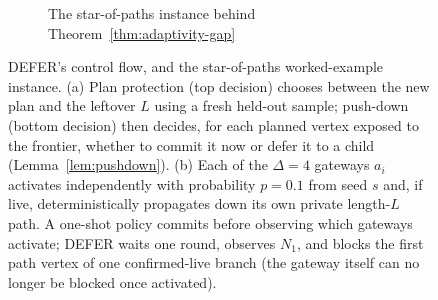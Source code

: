 \documentclass[preprint,11pt]{elsarticle}
\theoremstyle{definition}
\theoremstyle{remark}
\begin{document}
\begin{figure}[h]
\begin{subfigure}[t]{0.64\textwidth}
{}
\caption{The star-of-paths instance behind Theorem~\ref{thm:adaptivity-gap}}
\label{fig:star-of-paths}
\end{subfigure}

\caption{DEFER's control flow, and the star-of-paths worked-example instance. (a) Plan protection (top decision) chooses between the new plan and the
leftover $L$ using a fresh held-out sample; push-down (bottom decision)
then decides, for each planned vertex exposed to the frontier, whether to
commit it now or defer it to a child (Lemma~\ref{lem:pushdown}). (b) Each
of the $\Delta=4$ gateways $a_i$ activates independently with probability
$p=0.1$ from seed $s$ and, if live, deterministically propagates down its
own private length-$L$ path. A one-shot policy commits before observing
which gateways activate; DEFER waits one round, observes $N_1$, and
blocks the first path vertex of one confirmed-live branch (the gateway
itself can no longer be blocked once activated).}
\end{figure}
\end{document}

